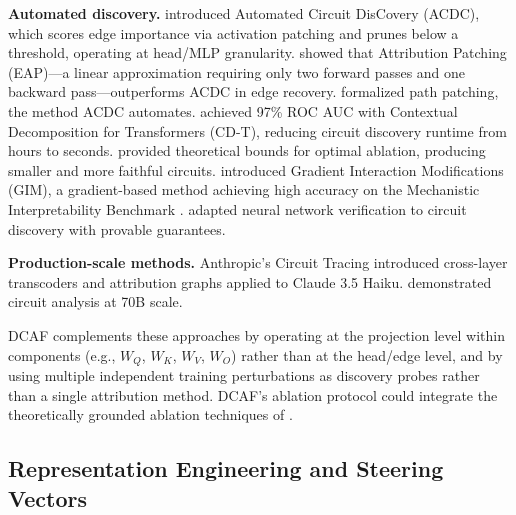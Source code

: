 \documentclass[11pt]{article}
\begin{document}
\textbf{Automated discovery.} \citet{conmy2023acdc} introduced Automated Circuit DisCovery (ACDC), which scores edge importance via activation patching and prunes below a threshold, operating at head/MLP granularity. \citet{syed2024attribution} showed that Attribution Patching (EAP)---a linear approximation requiring only two forward passes and one backward pass---outperforms ACDC in edge recovery. \citet{goldowsky2023path} formalized path patching, the method ACDC automates. \citet{hsu2025cdt} achieved 97\% ROC AUC with Contextual Decomposition for Transformers (CD-T), reducing circuit discovery runtime from hours to seconds. \citet{li2024optimal} provided theoretical bounds for optimal ablation, producing smaller and more faithful circuits. \citet{edin2025gim} introduced Gradient Interaction Modifications (GIM), a gradient-based method achieving high accuracy on the Mechanistic Interpretability Benchmark \citep{mueller2025mib}. \citet{hadad2026formal} adapted neural network verification to circuit discovery with provable guarantees.

\textbf{Production-scale methods.} Anthropic's Circuit Tracing \citep{ameisen2025tracing,lindsey2025biology} introduced cross-layer transcoders and attribution graphs applied to Claude 3.5 Haiku. \citet{lieberum2023chinchilla} demonstrated circuit analysis at 70B scale.

DCAF complements these approaches by operating at the projection level within components (e.g., $W_Q$, $W_K$, $W_V$, $W_O$) rather than at the head/edge level, and by using multiple independent training perturbations as discovery probes rather than a single attribution method. DCAF's ablation protocol could integrate the theoretically grounded ablation techniques of \citet{li2024optimal}.

\subsection{Representation Engineering and Steering Vectors}
\label{sec:representation-engineering-and-steering-vectors}
\end{document}
